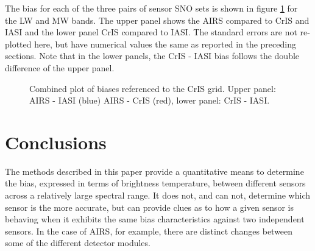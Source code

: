 \documentclass[11pt]{article}
\begin{document}
The bias for each of the three pairs of sensor SNO sets is shown in figure \ref{fig:U1} for the LW and MW bands. The upper panel shows the AIRS compared to CrIS and IASI and the lower panel CrIS compared to IASI.  The standard errors are not re-plotted here, but have numerical values the same as reported in the preceding sections. Note that in the lower panels, the CrIS - IASI bias follows the double difference of the upper panel.  


\begin{figure}[htb]
  \centering
  \quad
  \caption{\label{fig:orgparagraph21}
    Combined plot of biases referenced to the CrIS grid. Upper panel: AIRS - IASI (blue) AIRS - CrIS (red), lower panel: CrIS - IASI.}
  \label{fig:U1}
\end{figure}


\section{Conclusions}
\label{sec:orgheadline13}
The methods described in this paper provide a quantitative means to determine the bias, expressed in terms of brightness temperature, between different sensors across a relatively large spectral range. It does not, and can not, determine which sensor is the more accurate, but can provide clues as to how a given sensor is behaving when it exhibits the same bias characteristics against two independent sensors. In the case of AIRS, for example, there are distinct changes between some of the different detector modules.
\end{document}
